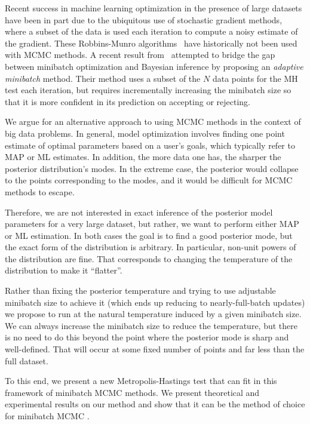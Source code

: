 \documentclass{article}
\begin{document}
Recent success in machine learning optimization in the presence of large datasets have been in part
due to the ubiquitous use of stochastic gradient methods, where a subset of the data is used each
iteration to compute a noisy estimate of the gradient. These Robbins-Munro
algorithms~\cite{RobbinsMonro1951} have historically not been used with MCMC methods. A recent
result from~\cite{cutting_mh_2014} attempted to bridge the gap between minibatch optimization and
Bayesian inference by proposing an \emph{adaptive minibatch} method. Their method uses a subset of
the $N$ data points for the MH test each iteration, but requires incrementally increasing the
minibatch size so that it is more confident in its prediction on accepting or rejecting.

We argue for an alternative approach to using MCMC methods in the context of big data problems. In
general, model optimization involves finding one point estimate of optimal parameters based on a
user's goals, which typically refer to MAP or ML estimates. In addition, the more data one has, the
sharper the posterior distribution's modes. In the extreme case, the posterior would collapse to the
points corresponding to the modes, and it would be difficult for MCMC methods to escape.

Therefore, we are not interested in exact inference of the posterior model parameters for a very
large dataset, but rather, we want to perform either MAP or ML estimation. In both cases the goal is
to find a good posterior mode, but the exact form of the distribution is arbitrary. In particular,
non-unit powers of the distribution are fine. That corresponds to changing the temperature of the
distribution to make it ``flatter''.

Rather than fixing the posterior temperature and trying to use adjustable minibatch size to achieve
it (which ends up reducing to nearly-full-batch updates) we propose to run at the natural
temperature induced by a given minibatch size. We can always increase the minibatch size to reduce
the temperature, but there is no need to do this beyond the point where the posterior mode is sharp
and well-defined. That will occur at some fixed number of points and far less than the full dataset.

To this end, we present a new Metropolis-Hastings test that can fit in this framework of minibatch
MCMC methods. We present theoretical and experimental results on our method and show that it can be
the method of choice for minibatch MCMC .
\end{document}

